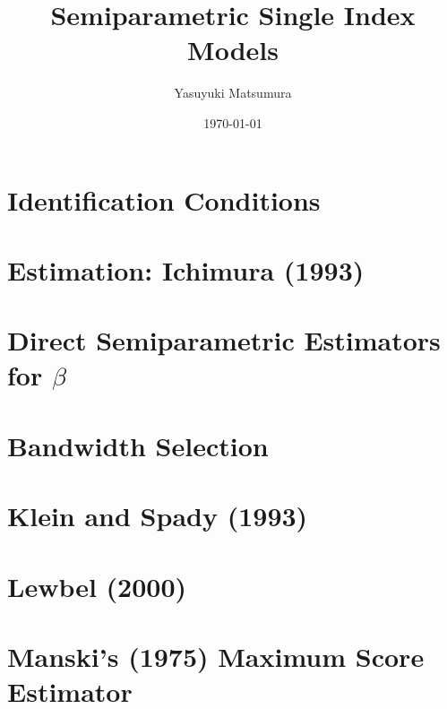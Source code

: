 \documentclass[xcolor=svgnames,dvipdfmx,cjk]{beamer}
\theoremstyle{example}
\begin{document}
 

\title[Li and Racine (2007, Chapter 8)]{Semiparametric Single Index Models} 
\author[Y. Matsumura]{Yasuyuki Matsumura}          
\date{\today}


\begin{frame}                  
\titlepage                     
\end{frame}


\begin{frame}                  
\tableofcontents
\end{frame}



\section{Identification Conditions}

\section{Estimation: Ichimura (1993)}

\section{Direct Semiparametric Estimators for $\beta$}

\section{Bandwidth Selection}

\section{Klein and Spady (1993)}

\section{Lewbel (2000)}

\section{Manski's (1975) Maximum Score Estimator}
\end{document}
